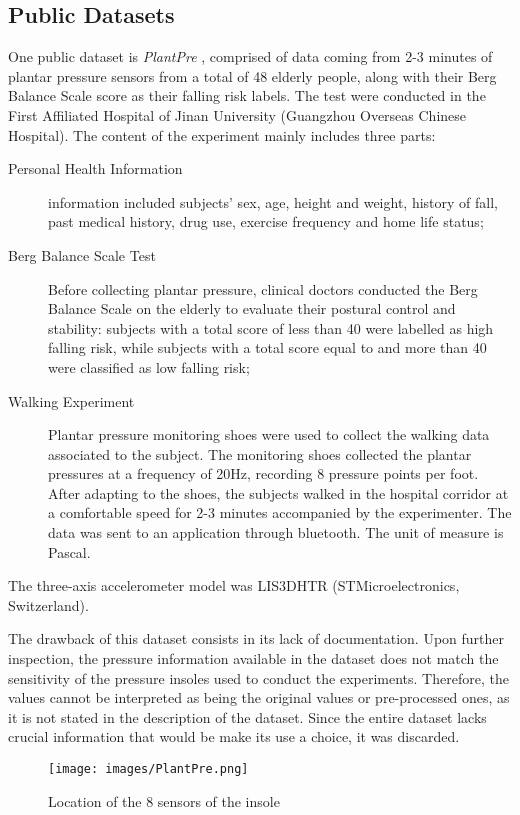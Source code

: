 \subsection{Public Datasets}
One public dataset is \textit{PlantPre} \cite{PlantPre}, comprised of data coming from 2-3 minutes of plantar pressure sensors from a total of 48 elderly people, along with their Berg Balance Scale score as their falling risk labels. The test were conducted in the First Affiliated Hospital of Jinan University (Guangzhou Overseas Chinese Hospital).
The content of the experiment mainly includes three parts: 
\begin{description}
    \item[Personal Health Information] information included subjects’ sex, age, height and weight, history of fall, past medical history, drug use, exercise frequency and home life status;
    \item[Berg Balance Scale Test] Before collecting plantar pressure, clinical doctors conducted the Berg Balance Scale on the elderly to evaluate their postural control and stability: subjects with a total score of less than 40 were labelled as high falling risk, while subjects with a total score equal to and more than 40 were classified as low falling risk;
    \item[Walking Experiment] Plantar pressure monitoring shoes were used to collect the walking data associated to the subject. The monitoring shoes collected the plantar pressures at a frequency of 20Hz, recording 8 pressure points per foot. After adapting to the shoes, the subjects walked in the hospital corridor at a comfortable speed for 2-3 minutes accompanied by the experimenter. The data was sent to an application through bluetooth. The unit of measure is Pascal.
\end{description}
The three-axis accelerometer model was LIS3DHTR (STMicroelectronics, Switzerland).

The drawback of this dataset consists in its lack of documentation. Upon further inspection, the pressure information available in the dataset does not match the sensitivity of the pressure insoles used to conduct the experiments. Therefore, the values cannot be interpreted as being the original values or pre-processed ones, as it is not stated in the description of the dataset. 
Since the entire dataset lacks crucial information that would be make its use a choice, it was discarded.
\begin{figure}[h!]
    \centering
    \texttt{[image: images/PlantPre.png]}
    \caption{Location of the 8 sensors of the insole}
    \label{fig:PlantPre}
\end{figure}
\FloatBarrier

